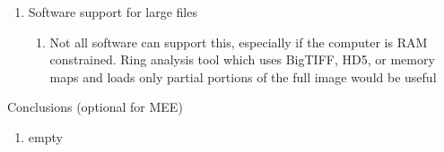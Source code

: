 \documentclass{article}
\begin{document}
\begin{outline}[enumerate]
\begin{enumerate}
\begin{enumerate}
		\end{enumerate}
	\item Software support for large files 
		\begin{enumerate}
		\item Not all software can support this, especially if the computer is RAM constrained. Ring analysis tool which uses BigTIFF, HD5, or memory maps and loads only partial portions of the full image would be useful
		\end{enumerate}
	\end{enumerate}
\item Conclusions (optional for MEE)
	\begin{enumerate}
	\item empty
	\end{enumerate}
        
\end{outline}
\end{document}
